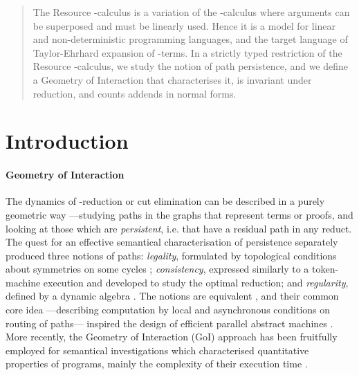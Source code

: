 \maketitle



\begin{abstract}
The Resource -calculus is a variation of the -calculus 
where arguments can be superposed and must be linearly used.
Hence it is a model for linear and non-deterministic programming languages, 
and the target language of Taylor-Ehrhard expansion of -terms.
In a strictly typed restriction of the  Resource -calculus, we study 
the notion of path persistence,
and we define a Geometry of Interaction that characterises it,
is invariant under reduction,
and counts addends in normal forms.
\end{abstract}

\section*{Introduction}

\paragraph{Geometry of Interaction}
The dynamics of -reduction or cut elimination can be described in a 
purely geometric way ---studying paths in the graphs that represent terms 
or proofs, and looking at those which are \textit{persistent}, i.e. that have a 
residual path in any reduct.
The quest for an effective semantical characterisation of persistence 
separately produced three notions of paths:
\textit{legality}, formulated by topological conditions about symmetries on 
some 
cycles \cite{AspertiLaneve:1995:TCS};
\textit{consistency}, expressed similarly to a token-machine execution 
\cite{GonthierAbadiLevy:1992:optimal} and developed to study the optimal 
reduction;
and \textit{regularity}, defined by a dynamic algebra
\cite{Girard:1989, DanosRegnier:1995}.
The notions are equivalent \cite{AspertiDanosLaneveRegnier:1994}, and their
common core idea ---describing computation by local and asynchronous 
conditions on routing of paths--- inspired the design of efficient parallel 
abstract machines 
\cite[for instance]{Mackie:1995, Pinto:2001}.
More recently, the Geometry of Interaction (GoI) approach has been fruitfully 
employed for semantical investigations which characterised quantitative 
properties of programs, mainly the complexity of their execution time 
\cite{DalLago:2009}.

